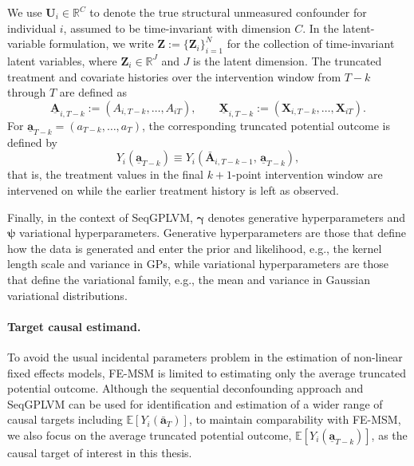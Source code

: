 We use \(\mathbf{U}_i \in \mathbb{R}^C\) to denote the true structural unmeasured confounder for
individual \(i\), assumed to be time-invariant with dimension \(C\). In the latent-variable formulation,
we write \(\mathbf{Z} := \{\mathbf{Z}_i\}_{i=1}^N\) for the collection of
time-invariant latent variables, where \(\mathbf{Z}_i \in \mathbb{R}^J\) and \(J\)
is the latent dimension. The truncated treatment and covariate histories over the intervention window from \(T-k\) through \(T\) are
defined as
\[
\underline{\mathbf{A}}_{i,T-k} := (A_{i,T-k},\dots,A_{iT}),
\qquad
\underline{\mathbf{X}}_{i,T-k} := (\mathbf{X}_{i,T-k},\dots,\mathbf{X}_{iT}).
\]
For \(\underline{\mathbf{a}}_{T-k} = (a_{T-k},\dots,a_T)\), the corresponding truncated
potential outcome is defined by
\[
Y_i(\underline{\mathbf{a}}_{T-k})
\equiv
Y_i(\bar{\mathbf{A}}_{i,T-k-1},\,\underline{\mathbf{a}}_{T-k}),
\]
that is, the treatment values in the final \(k+1\)-point intervention window are intervened on while the earlier
treatment history is left as observed. 

Finally, in the context of SeqGPLVM, \(\boldsymbol{\gamma}\) denotes generative 
hyperparameters and \(\boldsymbol{\psi}\) variational hyperparameters. 
Generative hyperparameters are 
those that define how the data is generated and enter the prior and likelihood, e.g., 
the kernel length scale and variance in GPs, while variational hyperparameters are those 
that define the variational family, e.g., the mean and variance in Gaussian variational 
distributions.

\paragraph{Target causal estimand.} To avoid the usual incidental parameters 
problem in the estimation of non-linear fixed effects models, FE-MSM 
is limited to estimating only the average truncated potential outcome. 
Although the sequential deconfounding approach and SeqGPLVM can be used for 
identification and estimation of a wider range of causal targets 
including $\mathbb{E}[Y_i(\bar{\mathbf{a}}_{T})]$, to maintain comparability with FE-MSM, 
we also focus on the average truncated potential outcome, $\mathbb{E}[Y_i(\underline{\mathbf{a}}_{T-k})]$, 
as the causal target of interest in this thesis. 




%
%
%


